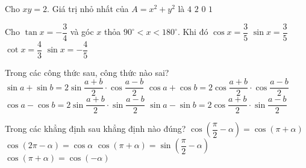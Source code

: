 \begin{ex}%
	Cho $xy = 2$. Giá trị nhỏ nhất của $ A = x^2 + y^2 $ là
	\choice
	{\True $4$}
	{$2$}
	{$0$}
	{$1$}
\end{ex}
\begin{ex}%
	Cho $ \tan x = -\dfrac{3}{4} $ và góc $ x $ thỏa $ 90^{\circ} < x < 180^{\circ} $. Khi đó
	\choice
	{$\cos x = \dfrac{3}{5}$}
	{\True$\sin x = \dfrac{3}{5}$}
	{$\cot x = \dfrac{4}{3}$} 
	{$\sin x = - \dfrac{4}{5}$}
	\loigiai{
		Ta có:$ \dfrac{1}{{\cos^2}x} = 1 + {\tan^2}x \\
		\Leftrightarrow \dfrac{1}{{\cos^2}x} = 1 + {\left( { - \dfrac{3}{4}} \right)^2}$ \\
		$\Leftrightarrow {\cos^2}x = \dfrac{16}{25}\\
		\Leftrightarrow \left[ {\begin{array}{l}
			{\cos x = \dfrac{4}{5}}\\
			{\cos x =  - \dfrac{4}{5}.}
			\end{array}} \right. $\\
		
		Vì $ 90^{\circ} < x < 180^{\circ} $ nên $ - 1 < \cos x < 0 $ . Do đó nhận $ \cos x = - \dfrac{4}{5} $.\\
		
		Ta có: $ \tan x = \dfrac{\sin x}{\cos x}   $
		 $\Rightarrow \sin x = \dfrac{3}{5} $ .
	}
\end{ex}

\begin{ex}%
	Trong các công thức sau, công thức nào sai?
	\choice
	{$\sin a + \sin b = 2\sin{\dfrac{a+b}{2}}\cdot\cos{\dfrac{a - b}{2}}$}
	{$\cos a + \cos b = 2\cos{\dfrac{a+b}{2}}\cdot\cos{\dfrac{a - b}{2}}$}
	{\True$\cos a - \cos b = 2\sin{\dfrac{a+b}{2}}\cdot\sin{\dfrac{a - b}{2}}$}
	{ $\sin a - \sin b = 2\cos{\dfrac{a+b}{2}}\cdot\sin{\dfrac{a - b}{2}}$}
	
\end{ex}


\begin{ex}%
	Trong các khẳng định sau khẳng định nào đúng?
	\choice
	{$ \cos \left(\dfrac{\pi}{2} - \alpha\right) = \cos(\pi + \alpha) $}
	{\True$\cos (2\pi - \alpha) = \cos{\alpha}$}
	{$\cos (\pi + \alpha) = \sin \left(\dfrac{\pi}{2} - \alpha\right)$}
	{$\cos(\pi + \alpha) = \cos (- \alpha)$}
\end{ex} 

